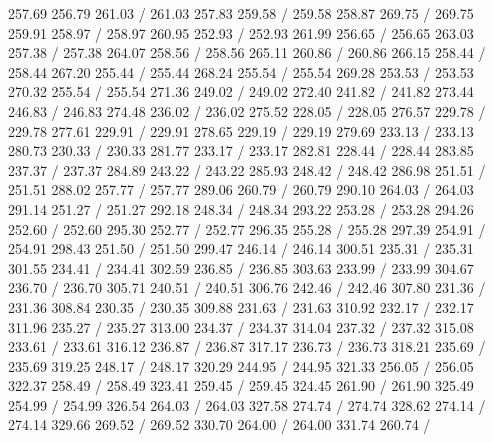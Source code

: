 { 257.69 256.79 261.03 /
 261.03 257.83 259.58 /
 259.58 258.87 269.75 /
 269.75 259.91 258.97 /
 258.97 260.95 252.93 /
 252.93 261.99 256.65 /
 256.65 263.03 257.38 /
 257.38 264.07 258.56 /
 258.56 265.11 260.86 /
 260.86 266.15 258.44 /
 258.44 267.20 255.44 /
 255.44 268.24 255.54 /
 255.54 269.28 253.53 /
 253.53 270.32 255.54 /
 255.54 271.36 249.02 /
 249.02 272.40 241.82 /
 241.82 273.44 246.83 /
 246.83 274.48 236.02 /
 236.02 275.52 228.05 /
 228.05 276.57 229.78 /
 229.78 277.61 229.91 /
 229.91 278.65 229.19 /
 229.19 279.69 233.13 /
 233.13 280.73 230.33 /
 230.33 281.77 233.17 /
 233.17 282.81 228.44 /
 228.44 283.85 237.37 /
 237.37 284.89 243.22 /
 243.22 285.93 248.42 /
 248.42 286.98 251.51 /
 251.51 288.02 257.77 /
 257.77 289.06 260.79 /
 260.79 290.10 264.03 /
 264.03 291.14 251.27 /
 251.27 292.18 248.34 /
 248.34 293.22 253.28 /
 253.28 294.26 252.60 /
 252.60 295.30 252.77 /
 252.77 296.35 255.28 /
 255.28 297.39 254.91 /
 254.91 298.43 251.50 /
 251.50 299.47 246.14 /
 246.14 300.51 235.31 /
 235.31 301.55 234.41 /
 234.41 302.59 236.85 /
 236.85 303.63 233.99 /
 233.99 304.67 236.70 /
 236.70 305.71 240.51 /
 240.51 306.76 242.46 /
 242.46 307.80 231.36 /
 231.36 308.84 230.35 /
 230.35 309.88 231.63 /
 231.63 310.92 232.17 /
 232.17 311.96 235.27 /
 235.27 313.00 234.37 /
 234.37 314.04 237.32 /
 237.32 315.08 233.61 /
 233.61 316.12 236.87 /
 236.87 317.17 236.73 /
 236.73 318.21 235.69 /
 235.69 319.25 248.17 /
 248.17 320.29 244.95 /
 244.95 321.33 256.05 /
 256.05 322.37 258.49 /
 258.49 323.41 259.45 /
 259.45 324.45 261.90 /
 261.90 325.49 254.99 /
 254.99 326.54 264.03 /
 264.03 327.58 274.74 /
 274.74 328.62 274.14 /
 274.14 329.66 269.52 /
 269.52 330.70 264.00 /
 264.00 331.74 260.74 /
}
